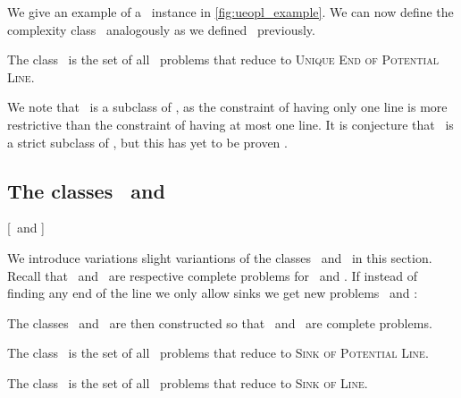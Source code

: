 We give an example of a \UniqueEndOfPotentialLine\ instance in \cref{fig:ueopl_example}. We can now define the complexity class \UEOPL\ analogously as we defined \EOPL\ previously.

\begin{definition}[\UEOPL]
	The class \UEOPL\ is the set of all \TFNP\ problems that reduce to \textsc{Unique End of Potential Line}.
\end{definition}

We note that \UEOPL\ is a subclass of \EOPL, as the constraint of having only one line is more restrictive than the constraint of having at most one line. It is conjecture that \UEOPL\ is a strict subclass of \EOPL, but this has yet to be proven .

\subsection{The classes \PPADS\ and \SOPL}[\PPADS\ and \SOPL]\label{sec:ppads_and_sopl}

We introduce variations slight variantions of the classes \PPAD\ and \EOPL\ in this section. Recall that \EndOfLine\ and \EndOfPotentialLine\ are respective complete problems for \PPAD\ and \EOPL\@. If instead of finding any end of the line we only allow sinks we get new problems \SinkOfPotentialLine\ and \SinkOfLine\@:



The classes \PPADS\ and \SOPL\ are then constructed so that \SinkOfPotentialLine\ and \SinkOfLine\ are complete problems.
\begin{definition}[\PPADS]
	The class \PPADS\ is the set of all \TFNP\ problems that reduce to \textsc{Sink of Potential Line}.
\end{definition}
\begin{definition}[\SOPL]
	The class \SOPL\ is the set of all \TFNP\ problems that reduce to \textsc{Sink of Line}.
\end{definition}

